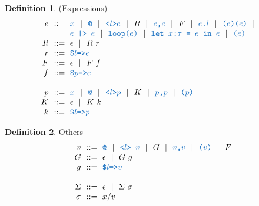 \documentclass[acmsmall]{acmart}
\theoremstyle{definition}
\newtheorem{definition}{Definition}[section]
\begin{document}
\begin{definition}(Expressions)
  \label{definition:expressions}
  \[\begin{array}[t]{r@{}l}
    \nonterm{e} 
    & 
    \is 
    \begin{array}[t]{@{}l}
      \obj{$x$} \sep 
      \obj{@} \sep
      \obj{<$l$>$e$} \sep 
      R \sep
      \obj{$e$,$e$} \sep
      F \sep 
      \obj{$e$.$l$} \sep
      \obj{($e$)($e$)} \sep
      \\
      \obj{$e$ |> $e$} \sep
      \obj{loop($e$)} \sep
      \obj{let $x$:$\tau$ = $e$ in $e$} \sep
      \obj{($e$)}
    \end{array}
    \\
    \nonterm{R} & \is \epsilon \sep R\ r
    \\
    \nonterm{r} & \is \obj{\$$l$=>$e$}
    \\
    \nonterm{F} & \is \epsilon \sep F\ f
    \\
    \nonterm{f} & \is \obj{\$$p$=>$e$}
    \\
    \\
    \nonterm{p} & \is 
      \obj{$x$} \sep
      \obj{@} \sep
      \obj{<$l$>$p$} \sep
      K \sep
      \obj{$p$,$p$} \sep
      \obj{($p$)} 
    \\
    \nonterm{K} & \is \epsilon \sep K\ k
    \\
    \nonterm{k} & \is \obj{\$$l$=>$p$}
  \end{array}\]
\end{definition}

\begin{definition} Others
  \label{definition:others}
  \[\begin{array}[t]{r@{}l}
    \nonterm{v} & \is 
      \obj{@} \sep
      \obj{<$l$> $v$} \sep
      G \sep
      \obj{$v$,$v$} \sep
      \obj{($v$)} \sep
      F 
    \\
    \nonterm{G} & \is \epsilon \sep G\ g
    \\
    \nonterm{g} & \is \obj{\$$l$=>$v$}
    \\
    \\
    \nonterm{\Sigma} & \is \epsilon \sep \Sigma\ \sigma
    \\
    \nonterm{\sigma} & \is x \slash v
  \end{array}\]
\end{definition}
\end{document}
